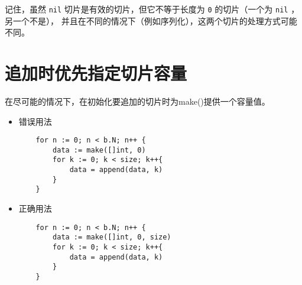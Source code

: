 记住，虽然 \texttt{nil} 切片是有效的切片，但它不等于长度为 \texttt{0} 的切片（一个为 \texttt{nil} ，另一个不是），
并且在不同的情况下（例如序列化），这两个切片的处理方式可能不同。

\section{追加时优先指定切片容量}
在尽可能的情况下，在初始化要追加的切片时为make()提供一个容量值。
\begin{itemize}[leftmargin=4em]
\item 错误用法

  \begin{verbatim}
    for n := 0; n < b.N; n++ {
    	data := make([]int, 0)
    	for k := 0; k < size; k++{
    		data = append(data, k)
    	}
    }
  \end{verbatim}
\item 正确用法

  \begin{verbatim}
    for n := 0; n < b.N; n++ {
    	data := make([]int, 0, size)
    	for k := 0; k < size; k++{
    		data = append(data, k)
    	}
    }
  \end{verbatim}
\end{itemize}
